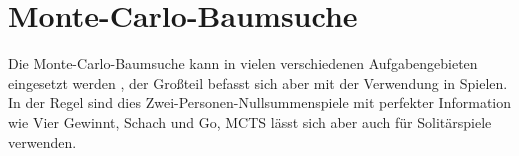 \section{Monte-Carlo-Baumsuche}

Die Monte-Carlo-Baumsuche kann in vielen verschiedenen Aufgabengebieten eingesetzt werden \autocite[Seite~23--33]{browneSurveyMonteCarlo2012}, der Großteil befasst sich aber mit der Verwendung in Spielen. In der Regel sind dies Zwei-Personen-Nullsummenspiele mit perfekter Information wie Vier Gewinnt, Schach und Go, MCTS lässt sich aber auch für Solitärspiele verwenden.
